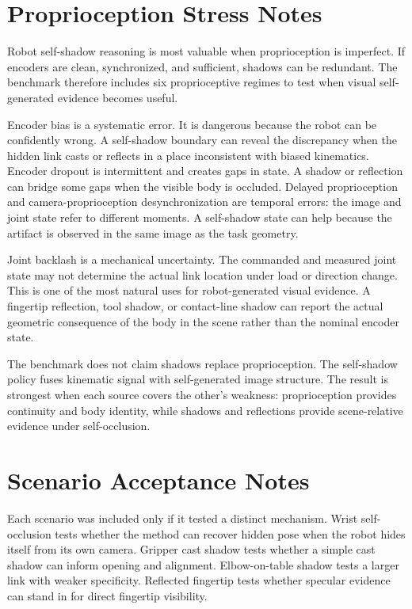 \documentclass{article}
\begin{document}
\clearpage
\section{Proprioception Stress Notes}

Robot self-shadow reasoning is most valuable when proprioception is imperfect. If encoders are clean, synchronized, and sufficient, shadows can be redundant. The benchmark therefore includes six proprioceptive regimes to test when visual self-generated evidence becomes useful.

Encoder bias is a systematic error. It is dangerous because the robot can be confidently wrong. A self-shadow boundary can reveal the discrepancy when the hidden link casts or reflects in a place inconsistent with biased kinematics. Encoder dropout is intermittent and creates gaps in state. A shadow or reflection can bridge some gaps when the visible body is occluded. Delayed proprioception and camera-proprioception desynchronization are temporal errors: the image and joint state refer to different moments. A self-shadow state can help because the artifact is observed in the same image as the task geometry.

Joint backlash is a mechanical uncertainty. The commanded and measured joint state may not determine the actual link location under load or direction change. This is one of the most natural uses for robot-generated visual evidence. A fingertip reflection, tool shadow, or contact-line shadow can report the actual geometric consequence of the body in the scene rather than the nominal encoder state.

The benchmark does not claim shadows replace proprioception. The self-shadow policy fuses kinematic signal with self-generated image structure. The result is strongest when each source covers the other's weakness: proprioception provides continuity and body identity, while shadows and reflections provide scene-relative evidence under self-occlusion.

\clearpage
\section{Scenario Acceptance Notes}

Each scenario was included only if it tested a distinct mechanism. Wrist self-occlusion tests whether the method can recover hidden pose when the robot hides itself from its own camera. Gripper cast shadow tests whether a simple cast shadow can inform opening and alignment. Elbow-on-table shadow tests a larger link with weaker specificity. Reflected fingertip tests whether specular evidence can stand in for direct fingertip visibility.
\end{document}

